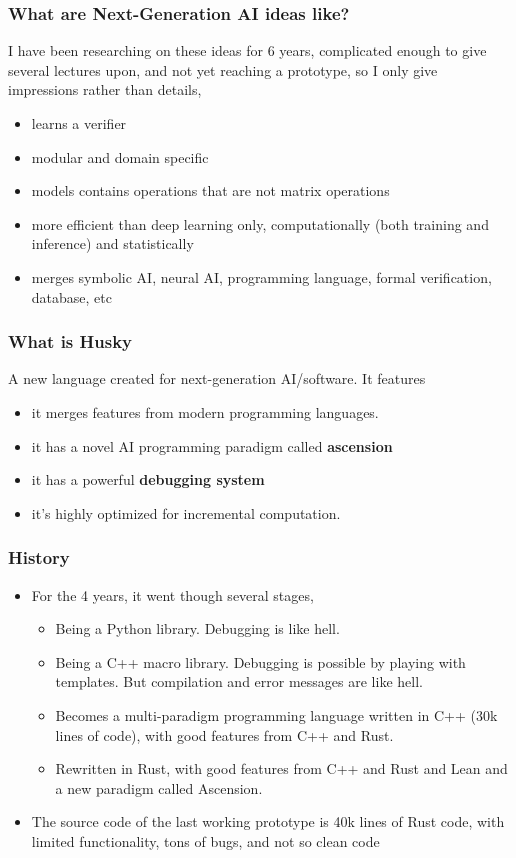 \documentclass{beamer}   	%
\theoremstyle{definition}
\begin{document}
\begin{frame}
\frametitle{What are Next-Generation AI ideas like?}
I have been researching on these ideas for 6 years, complicated enough to give several lectures upon, and not yet reaching a prototype, so I only give impressions rather than details,
\begin{itemize}
	\item learns a verifier
	\item modular and domain specific
	\item models contains operations that are not matrix operations
	\item more efficient than deep learning only, computationally (both training and inference) and statistically
	\item merges symbolic AI, neural AI, programming language, formal verification, database, etc
\end{itemize}
\end{frame}

\begin{frame}
\frametitle{What is Husky}
A new language created for next-generation AI/software. It features
\begin{itemize}
	\item it merges features from modern programming languages.
	\item it has a novel AI programming paradigm called \textbf{ascension}
	\item it has a powerful \textbf{debugging system}
	\item it's highly optimized for incremental computation.
\end{itemize}
\end{frame}

\begin{frame}
\frametitle{History}
\begin{itemize}
	\item For the 4 years, it went though several stages,
	\begin{itemize}
		\item Being a Python library. Debugging is like hell.
		\item Being a C++ macro library. Debugging is possible by playing with templates. But compilation and error messages are like hell.
		\item Becomes a multi-paradigm programming language written in C++ (30k lines of code), with good features from C++ and Rust.
		\item Rewritten in Rust, with good features from C++ and Rust and Lean and a new paradigm called Ascension.
	\end{itemize}
	\item The source code of the last working prototype is 40k lines of Rust code, with limited functionality, tons of bugs, and not so clean code
\end{itemize}
\end{frame}
\end{document}
